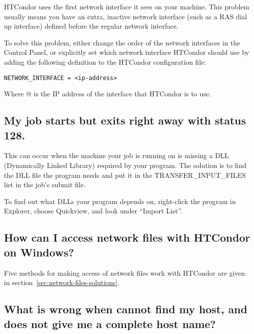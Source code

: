 HTCondor uses the first network interface it sees on your machine.
This problem usually means you have an extra, inactive network
interface (such as a RAS dial up interface) defined before the
regular network interface.

To solve this problem, either change the order of the network
interfaces in the Control Panel, or explicitly set which network
interface HTCondor should use by adding the following definition to the
HTCondor configuration file:

\begin{verbatim}
NETWORK_INTERFACE = <ip-address>
\end{verbatim}

Where @ is the IP address of the interface that
HTCondor is to use.

\subsection*{My job starts but exits right away with status 128.}

This can occur when the machine your job is running on is missing a
DLL (Dynamically Linked Library) required by your program.
The solution is to find the DLL file the program needs and put it in
the TRANSFER\_INPUT\_FILES list in the job's submit file.

To find out what DLLs your program depends on, right-click the program
in Explorer, choose Quickview, and look under ``Import List''.


\subsection*{How can I access network files with HTCondor on Windows?}

Five methods for making access of network files work with HTCondor
are given in 
section~\ref{sec:network-files-solutions}.

\subsection*{What is wrong when  cannot find my host, and  does not give me a complete host name?}

